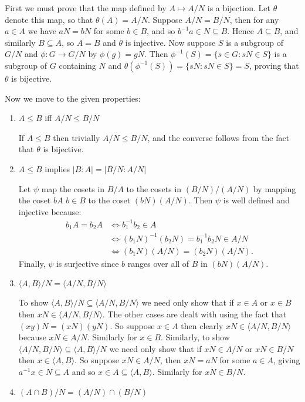 \documentclass[12pt]{article}
\newcommand{\ang}[1]{\langle{#1}\rangle}
\begin{document}
First we must prove that the map defined by $A\mapsto A/N$ is a bijection. Let $\theta $ denote this map, so that $\theta (A)=A/N$. Suppose $A/N = B/N$, then for any $a\in A$ we have $aN = bN$ for some $b\in B$, and so $b^{-1}a\in N\subseteq B$. Hence $A\subseteq B$, and similarly $B\subseteq A$, so $A=B$ and $\theta$ is injective.
Now suppose $S$ is a subgroup of $G/N$ and $\phi :G\to G/N$ by $\phi (g) = gN$. Then $\phi ^{-1}(S) = \{s\in G : sN\in S\}$ is a subgroup of $G$ containing $N$ and $\theta (\phi ^{-1}(S)) = \{sN : sN\in S\} = S$, proving that $\theta$ is bijective.

Now we move to the given properties:
\begin{enumerate}
\item $A\leq B$ iff $A/N\leq B/N$

If $A\leq B$ then trivially $A/N\leq B/N $, and the converse follows from the fact that $\theta $ is bijective. 

\item $A\leq B$ implies $\left| B:A\right| =\left| B/N:A/N \right| $

Let $\psi $ map the cosets in $B/A $ to the cosets in $(B/N)/(A/N)$ by mapping the coset $bA$ $b\in B$ to the coset $(bN)(A/N)$. Then $\psi $ is well defined and injective because:
\begin{align*}
b_{1}A=b_{2}A & \iff b_{1}^{-1}b_{2}\in A\\
 & \iff (b_{1}N)^{-1}(b_{2}N)=b_{1}^{-1}b_{2}N\in A/N\\
 & \iff (b_{1}N)(A/N) = (b_{2}N)(A/N).
\end{align*}
Finally, $\psi $ is surjective since $b$ ranges over all of $B$ in $(bN)(A/N)$.

\item $\ang{A,B}/N=\ang{A/N,B/N}$

To show $\ang{A,B}/N\subseteq \ang{A/N,B/N}$ we need only show that if $x\in A$ or $x\in B$ then $xN\in \ang{A/N,B/N}$. The other cases are dealt with using the fact that $(xy)N=(xN)(yN)$. So suppose $x\in A$ then clearly $xN\in \ang{A/N,B/N}$ because $xN\in A/N$. Similarly for $x\in B$.
Similarly, to show $\ang{A/N,B/N}\subseteq \ang{A,B}/N$ we need only show that if $xN\in A/N$ or $xN\in B/N$ then $x\in \ang{A,B}$. So suppose $xN\in A/N$, then $xN=aN$ for some $a\in A$, giving $a^{-1}x\in N \subseteq A$ and so $x\in A\subseteq \ang{A,B}$. Similarly for $xN\in B/N$.

\item $(A\cap B)/N=(A/N)\cap (B/N)$


\end{enumerate}
\end{document}
